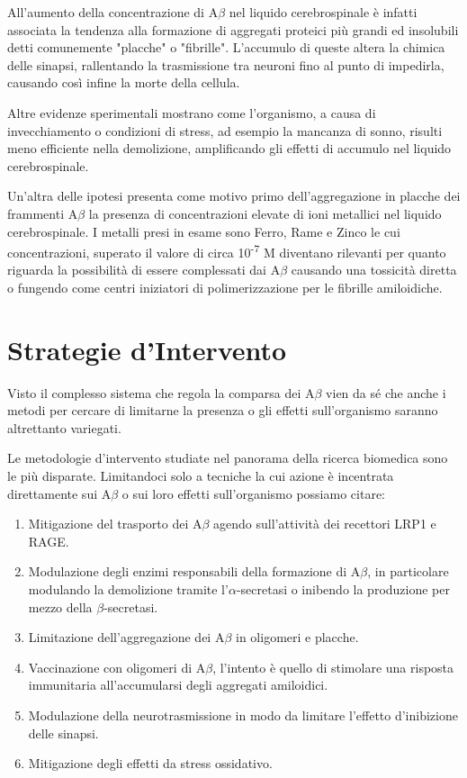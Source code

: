 \documentclass[a4paper, 12pt]{article}
\begin{document}
All'aumento della concentrazione di A$\beta$ nel liquido cerebrospinale è infatti associata la tendenza alla formazione di aggregati proteici più grandi ed insolubili detti comunemente "placche" o "fibrille".
L'accumulo di queste altera la chimica delle sinapsi, rallentando la trasmissione tra neuroni fino al punto di impedirla, causando così infine la morte della cellula.

Altre evidenze sperimentali mostrano come l’organismo, a causa di invecchiamento o condizioni di stress, ad esempio la mancanza di sonno, risulti meno efficiente nella demolizione, amplificando gli effetti di accumulo nel liquido cerebrospinale.

Un'altra delle ipotesi presenta come motivo primo dell'aggregazione in placche dei frammenti A$\beta$ la presenza di concentrazioni elevate di ioni metallici nel liquido cerebrospinale. I metalli presi in esame sono Ferro, Rame e Zinco le cui concentrazioni, superato il valore di circa 10\textsuperscript{-7}  M diventano rilevanti per quanto riguarda la possibilità di essere complessati dai A$\beta$ causando una tossicità diretta o fungendo come centri iniziatori di polimerizzazione per le fibrille amiloidiche.\cite{kepp_bioinorganic_2012}

\section{Strategie d'Intervento}
Visto il complesso sistema che regola la comparsa dei A$\beta$ vien da sé che anche i metodi per cercare di limitarne la presenza o gli effetti sull'organismo saranno altrettanto variegati.

Le metodologie d'intervento studiate nel panorama della ricerca biomedica sono le più disparate. Limitandoci solo a tecniche la cui azione è incentrata direttamente sui A$\beta$ o sui loro effetti sull'organismo possiamo citare:\cite{kumar_review_2015}
\begin{enumerate}
	\item Mitigazione del trasporto dei A$\beta$ agendo sull'attività dei recettori LRP1 e RAGE.
	\item Modulazione degli enzimi responsabili della formazione di A$\beta$, in particolare modulando la demolizione tramite l'$\alpha$-secretasi o inibendo la produzione per mezzo della $\beta$-secretasi.
	\item Limitazione dell'aggregazione dei A$\beta$ in oligomeri e placche.
	\item Vaccinazione con oligomeri di A$\beta$, l'intento è quello di stimolare una risposta immunitaria all'accumularsi degli aggregati amiloidici.
	\item Modulazione della neurotrasmissione in modo da limitare l'effetto d'inibizione delle sinapsi.
	\item Mitigazione degli effetti da stress ossidativo.
\end{enumerate}
\end{document}
